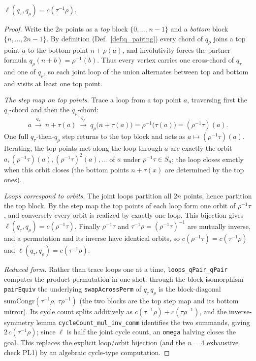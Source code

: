 \begin{lemma}\label{lem:loops_q_q}
\leanok
{}
$\ell(q_\tau, q_\rho) = c(\tau^{-1}\rho)$.
\end{lemma}

\begin{proof}
\leanok
Write the $2n$ points as a \emph{top} block $\{0,\dots,n-1\}$ and a
\emph{bottom} block $\{n,\dots,2n-1\}$. By definition (Def.~\ref{def:q_pairing})
every chord of $q_\rho$ joins a top point $a$ to the bottom point $n+\rho(a)$,
and involutivity forces the partner formula $q_\rho(n+b)=\rho^{-1}(b)$. Thus
every vertex carries one cross-chord of $q_\tau$ and one of $q_\rho$, so each
joint loop of the union alternates between top and bottom and visits at least
one top point.

\medskip
\noindent\emph{The step map on top points.} Trace a loop from a top point
$a$, traversing first the $q_\tau$-chord and then the $q_\rho$-chord:
\[
  a\ \xrightarrow{\,q_\tau\,}\ n+\tau(a)
   \ \xrightarrow{\,q_\rho\,}\ q_\rho\bigl(n+\tau(a)\bigr)
   =\rho^{-1}\bigl(\tau(a)\bigr)=(\rho^{-1}\tau)(a).
\]
One full $q_\tau$-then-$q_\rho$ step returns to the top block and acts as
$a\mapsto(\rho^{-1}\tau)(a)$. Iterating, the top points met along the loop
through $a$ are exactly the orbit $a,(\rho^{-1}\tau)(a),(\rho^{-1}\tau)^2(a),\dots$
of $a$ under $\rho^{-1}\tau\in S_n$; the loop closes exactly when this orbit
closes (the bottom points $n+\tau(x)$ are determined by the top ones).

\medskip
\noindent\emph{Loops correspond to orbits.} The joint loops partition all
$2n$ points, hence partition the top block. By the step map the top points of
each loop form one orbit of $\rho^{-1}\tau$, and conversely every orbit is
realized by exactly one loop. This bijection gives
$\ell(q_\tau,q_\rho)=c(\rho^{-1}\tau)$. Finally $\rho^{-1}\tau$ and
$\tau^{-1}\rho=(\rho^{-1}\tau)^{-1}$ are mutually inverse, and a permutation and
its inverse have identical orbits, so $c(\rho^{-1}\tau)=c(\tau^{-1}\rho)$ and
$\ell(q_\tau,q_\rho)=c(\tau^{-1}\rho)$.

\medskip\noindent\emph{Reduced form.} Rather than trace loops one at a time,
\texttt{loops\_qPair\_qPair} computes the product permutation in one shot: through
the block isomorphism \texttt{pairEquiv} the underlying \texttt{swapAcrossPerm}
of $q_\tau\,q_\rho$ is the block-diagonal $\mathrm{sumCongr}(\tau^{-1}\rho,\,\tau\rho^{-1})$
(the two blocks are the top step map and its bottom mirror). Its cycle count
splits additively as $c(\tau^{-1}\rho)+c(\tau\rho^{-1})$, and the
inverse-symmetry lemma \texttt{cycleCount\_mul\_inv\_comm} identifies the two
summands, giving $2\,c(\tau^{-1}\rho)$; since $\ell$ is half the joint cycle
count, an \texttt{omega} halving closes the goal. This replaces the explicit
loop/orbit bijection (and the $n=4$ exhaustive check PL1) by an algebraic
cycle-type computation.
\end{proof}

